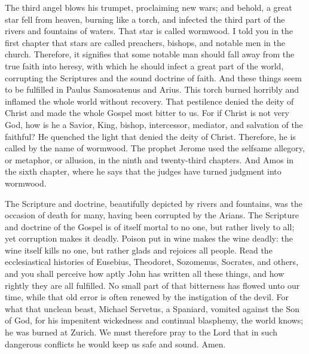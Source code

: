 The third angel blows his trumpet, proclaiming new wars; and behold, a great star fell from heaven, burning like a torch, and infected the third part of the rivers and fountains of waters. That star is called wormwood. I told you in the first chapter that stars are called preachers, bishops, and notable men in the church. Therefore, it signifies that some notable man should fall away from the true faith into heresy, with which he should infect a great part of the world, corrupting the Scriptures and the sound doctrine of faith. And these things seem to be fulfilled in Paulus Samosatenus and Arius. This torch burned horribly and inflamed the whole world without recovery. That pestilence denied the deity of Christ and made the whole Gospel most bitter to us. For if Christ is not very God, how is he a Savior, King, bishop, intercessor, mediator, and salvation of the faithful? He quenched the light that denied the deity of Christ. Therefore, he is called by the name of wormwood. The prophet Jerome used the selfsame allegory, or metaphor, or allusion, in the ninth and twenty-third chapters. And Amos in the sixth chapter, where he says that the judges have turned judgment into wormwood.

The Scripture and doctrine, beautifully depicted by rivers and fountains, was the occasion of death for many, having been corrupted by the Arians. The Scripture and doctrine of the Gospel is of itself mortal to no one, but rather lively to all; yet corruption makes it deadly. Poison put in wine makes the wine deadly: the wine itself kills no one, but rather glads and rejoices all people. Read the ecclesiastical histories of Eusebius, Theodoret, Sozomenus, Socrates, and others, and you shall perceive how aptly John has written all these things, and how rightly they are all fulfilled. No small part of that bitterness has flowed unto our time, while that old error is often renewed by the instigation of the devil. For what that unclean beast, Michael Servetus, a Spaniard, vomited against the Son of God, for his impenitent wickedness and continual blasphemy, the world knows; he was burned at Zurich. We must therefore pray to the Lord that in such dangerous conflicts he would keep us safe and sound. Amen.
